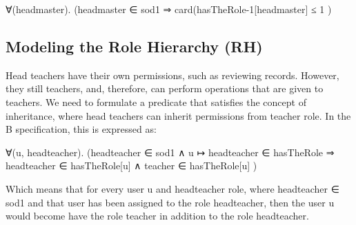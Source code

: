 ∀(headmaster). (headmaster ∈ sod1  ⇒ 
                            card(hasTheRole-1[{headmaster}]  ≤ 1 )  

\subsection{Modeling the Role Hierarchy (RH)}
     Head teachers have their own permissions, such as reviewing records.  However, they still teachers, and, therefore, can perform operations that are given to teachers.  We need to formulate a predicate that satisfies the concept of inheritance, where head teachers can inherit permissions from teacher role.  In the B specification, this is expressed as:

∀(u, headteacher). (headteacher  ∈ sod1  ∧  u ↦ headteacher   ∈ hasTheRole
⇒  headteacher  ∈ hasTheRole[{u}]   ∧  teacher  ∈ hasTheRole[{u}] )

    Which means that for every user u and headteacher role, where headteacher ∈ sod1 and that user has been assigned to the role headteacher, then the user u would become have the role teacher in addition to the role headteacher.
